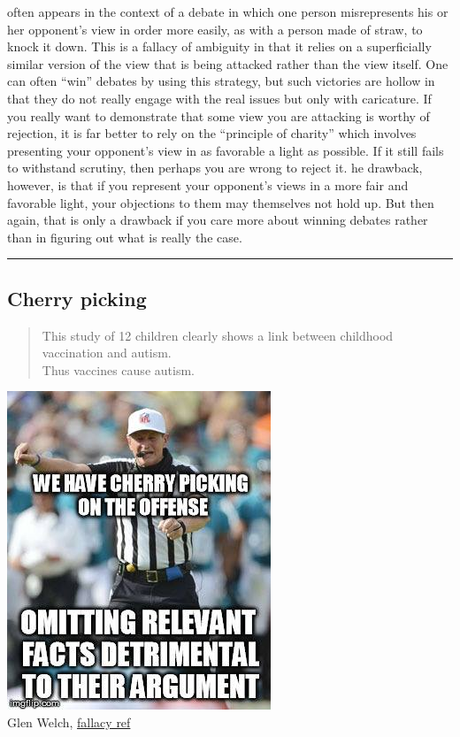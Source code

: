 \documentclass[justified]{tufte-book}
\newenvironment{argument}{\begin{quote}\normalsize}{\end{quote}}
\begin{document}
 often appears in the context of a debate in which one person misrepresents his or her opponent's view in order more easily, as with a person made of straw, to knock it down. This is a fallacy of ambiguity in that it relies on a superficially similar version of the view that is being attacked rather than the view itself. One can often ``win'' debates by using this strategy, but such victories are hollow in that they do not really engage with the real issues but only with caricature. If you really want to demonstrate that some view you are attacking is worthy of rejection, it is far better to rely on the ``principle of charity'' which involves presenting your opponent's view in as favorable a light as possible. If it still fails to withstand scrutiny, then perhaps you are wrong to reject it. he drawback, however, is that if you represent your opponent's views in a more fair and favorable light, your objections to them may themselves not hold up. But then again, that is only a drawback if you care more about winning debates rather than in figuring out what is really the case.

\begin{center}\rule{0.5\linewidth}{\linethickness}\end{center}

\hypertarget{cherry-picking}{%
\subsection*{Cherry picking}\label{cherry-picking}}

\begin{argument}
This study of 12 children clearly shows a link between childhood
vaccination and autism.\\
Thus vaccines cause autism.
\end{argument}

\begin{marginfigure}
\includegraphics{img/fallacies/cherry-picking.jpg}\\
Glen Welch, \href{https://twitter.com/fallacy_ref?lang=en}{fallacy ref}
\end{marginfigure}
\end{document}
